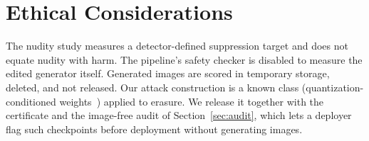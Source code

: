 \section*{Ethical Considerations}
The nudity study measures a detector-defined suppression target and does not equate
nudity with harm. The pipeline's safety checker is disabled to measure the edited
generator itself. Generated images are scored in temporary storage, deleted, and not
released. Our attack construction is a known class (quantization-conditioned
weights~\cite{egashira2024}) applied to erasure. We release it together with the
certificate and the image-free audit of Section~\ref{sec:audit}, which lets a deployer
flag such checkpoints before deployment without generating images.
